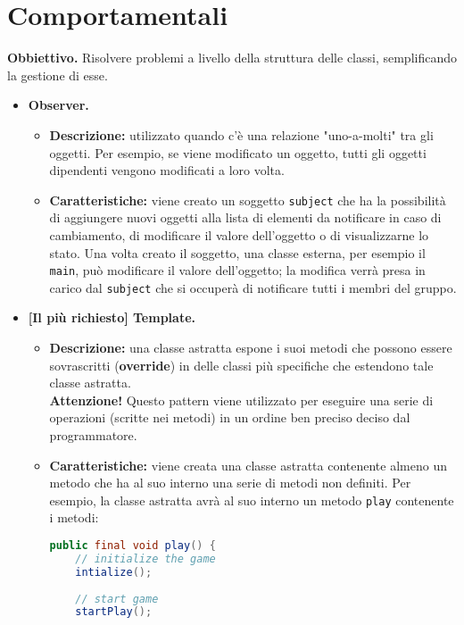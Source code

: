 \documentclass[a4paper,11pt]{article}
\begin{document}
\section{Comportamentali}
\textcolor{Mahogany}{\textbf{Obbiettivo.}} Risolvere problemi a livello della struttura delle classi, semplificando la gestione di esse.
\begin{itemize}
	\item[\ding{42}] \textbf{Observer.}
		\begin{itemize}
			\item \textbf{Descrizione:} utilizzato quando c'è una relazione "uno-a-molti" tra gli oggetti. Per esempio, se viene modificato un oggetto, tutti gli oggetti dipendenti vengono modificati a loro volta.
			\item \textbf{Caratteristiche:} viene creato un soggetto \texttt{subject} che ha la possibilità di aggiungere nuovi oggetti alla lista di elementi da notificare in caso di cambiamento, di modificare il valore dell'oggetto o di visualizzarne lo stato. Una volta creato il soggetto, una classe esterna, per esempio il \texttt{main}, può modificare il valore dell'oggetto; la modifica verrà presa in carico dal \texttt{subject} che si occuperà di notificare tutti i membri del gruppo.
		\end{itemize}

\newpage

	\item[\ding{42}] \textbf{[Il più richiesto] Template.}
		\begin{itemize}
			\item \textbf{Descrizione:} una classe astratta espone i suoi metodi che possono essere sovrascritti (\textbf{override}) in delle classi più specifiche che estendono tale classe astratta.\\
			\textbf{Attenzione!} Questo pattern viene utilizzato per eseguire una serie di operazioni (scritte nei metodi) in un ordine ben preciso deciso dal programmatore.
			\item \textbf{Caratteristiche:} viene creata una classe astratta contenente almeno un metodo che ha al suo interno una serie di metodi non definiti. Per esempio, la classe astratta avrà al suo interno un metodo \texttt{play} contenente i metodi:
			\begin{lstlisting}[language=Java]
public final void play() {
	// initialize the game
	intialize();
	
	// start game
	startPlay();
	

\end{lstlisting}
\end{itemize}
\end{itemize}
\end{document}
